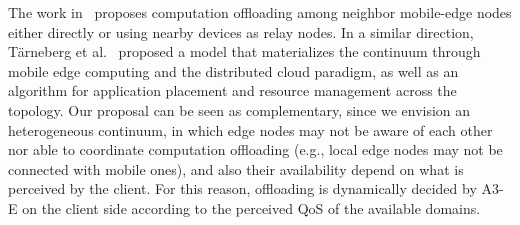 The work in~\cite{Satria2017mec} proposes computation offloading among neighbor mobile-edge nodes either directly or using nearby devices as relay nodes. 
In a similar direction, T\"arneberg et al.~\cite{Tarneberg2017} proposed a model that materializes the continuum through mobile edge computing and the distributed cloud paradigm, as well as an algorithm for application placement and resource management across the topology. Our proposal can be seen as complementary, since we envision an heterogeneous continuum, in which edge nodes may not be aware of each other nor able to coordinate computation offloading (e.g., local edge nodes may not be connected with mobile ones), and also their availability depend on what is perceived by the client. For this reason, offloading is dynamically decided by A3-E on the client side according to the perceived QoS of the available domains. 






